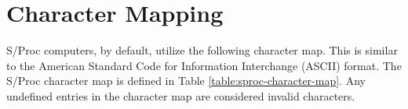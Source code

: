 \documentclass{article}
\begin{document}
\pagebreak

\section{Character Mapping}
\label{sec:character-map}

S/Proc computers, by default, utilize the following character map. This is similar to the American Standard Code for Information Interchange (ASCII) format. The S/Proc character map is defined in Table \ref{table:sproc-character-map}. Any undefined entries in the character map are considered invalid characters.

\newcommand{\charmap}[1]{\texttt{#1}}

\newcommand{\charslash}{\texttt{\char`\\}}

\newcommand{\charmapescape}[1]{\charmap{\texttt{\charslash#1}}}
\end{document}
